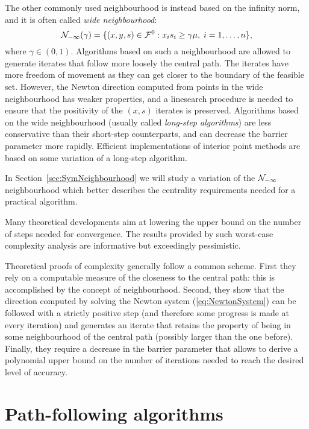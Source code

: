The other commonly used neighbourhood is instead based on the infinity norm, 
and it is often called {\em wide neighbourhood}:
\[
\mathcal{N}_{-\infty}(\gamma) = \{ (x,y,s) \in \mathcal{F}^0 :
                         x_is_i \ge \gamma\mu, \; i = 1, \ldots, n \},
\]
where $\gamma \in (0,1).$
Algorithms based on such a neighbourhood are allowed to generate
iterates that follow more loosely the central path. The iterates 
have more freedom of movement as they can get closer to the boundary
of the feasible set.
However, the Newton direction computed from points in the wide 
neighbourhood  has weaker properties, and a linesearch procedure is
needed to ensure that the positivity of the $(x,s)$ iterates is
preserved.
Algorithms based on the wide neighbourhood (usually called
{\em long-step algorithms}) are less conservative than their short-step
counterparts, and can decrease 
the barrier parameter more rapidly.
Efficient implementations of interior point methods are based
on some variation of a long-step algorithm.

In Section~\ref{sec:SymNeighbourhood} we will study a variation
of the $\mathcal{N}_{-\infty}$ neighbourhood which better describes
the centrality requirements needed for a practical algorithm.


\hrulefill

Many theoretical developments aim at lowering the upper bound on the number 
of steps needed for convergence. The results provided by such worst-case 
complexity analysis are informative but exceedingly pessimistic. 

Theoretical proofs of complexity generally follow a common scheme.
First they rely on a computable measure of the closeness to the central
path: this is accomplished by the concept of neighbourhood. Second,
they show that the direction computed by solving the Newton system
(\ref{eq:NewtonSystem}) can be followed with a strictly positive step
(and therefore some progress is made at every iteration) 
and generates an iterate 
that retains the property of being in some neighbourhood of the central 
path (possibly larger than the one before). Finally, they require
a decrease in the barrier parameter that allows to derive a polynomial upper
bound on the number of iterations needed to reach the desired
level of accuracy.


%
%
\section{Path-following algorithms}
\label{sec:PathFollowingAlgorithms}

